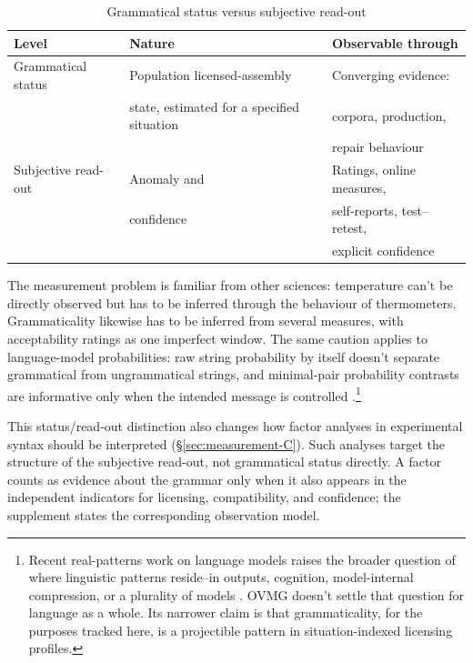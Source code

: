 \documentclass[12pt,letterpaper]{article}
\begin{document}
\begin{table}[h]
\centering
\caption{Grammatical status versus subjective read-out}
\label{tab:two-levels}
\begin{tabular}{@{}>{\raggedright\arraybackslash}p{}
  >{\raggedright\arraybackslash}p{}
  >{\raggedright\arraybackslash}p{}@{}}
\toprule
Level & Nature & Observable through\\
\midrule
Grammatical status & Population licensed-assembly & Converging evidence:\\
& state, estimated for a specified situation & corpora, production,\\
& & repair behaviour\\[6pt]
Subjective read-out & Anomaly and & Ratings, online measures,\\
& confidence & self-reports, test--retest,\\
& & explicit confidence\\
\bottomrule
\end{tabular}
\end{table}

The measurement problem is familiar from other sciences: temperature can't be directly observed but has to be inferred through the behaviour of thermometers. Grammaticality likewise has to be inferred from several measures, with acceptability ratings as one imperfect window. The same caution applies to language-model probabilities: raw string probability by itself doesn't separate grammatical from ungrammatical strings, and minimal-pair probability contrasts are informative only when the intended message is controlled \autocite{HuEtAl2026StringProbability}.\footnote{Recent real-patterns work on language models raises the broader question of where linguistic patterns reside--in outputs, cognition, model-internal compression, or a plurality of models \autocite{nefdtLadyman2026RealPatterns}. OVMG doesn't settle that question for language as a whole. Its narrower claim is that grammaticality, for the purposes tracked here, is a projectible pattern in situation-indexed licensing profiles.}

This status/read-out distinction also changes how factor analyses in
experimental syntax should be interpreted (\S\ref{sec:measurement-C}). Such
analyses target the structure of the subjective read-out, not grammatical
status directly. A factor counts as evidence about the grammar only when it
also appears in the independent indicators for licensing, compatibility, and
confidence; the supplement states the corresponding observation model.
\end{document}
